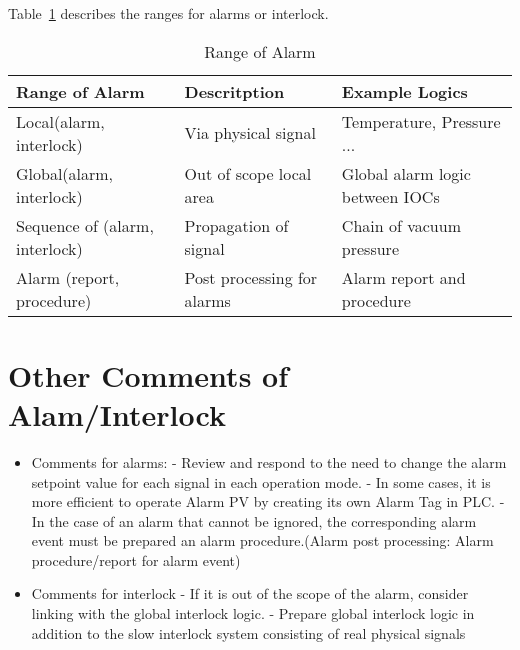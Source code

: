 \documentclass[11pt
  , letterpaper
  , article
  , oneside
  , showtrims
]{memoir}
\begin{document}
Table~\ref{table:scope_alarm} describes the ranges for alarms or interlock. 

\begin{table}[!h]
	\centering
	\begin{tabularx}{\textwidth}{l|l|l}
		\toprule
		Range of Alarm    				& Descritption       & Example Logics \\
		\midrule
		Local(alarm, interlock)         & Via physical signal  & Temperature, Pressure ... \\
		Global(alarm, interlock)        & Out of scope local area & Global alarm logic between IOCs\\ 
		Sequence of (alarm, interlock)  & Propagation of signal   & Chain of vacuum pressure \\
		Alarm (report, procedure) 	    & Post processing for alarms & Alarm report and procedure \\
		\bottomrule
	\end{tabularx}
	\label{table:scope_alarm}
	\caption{Range of Alarm}
\end{table}

\section{Other Comments of Alam/Interlock}
\begin{itemize}
	\item Comments for alarms:
	\newline
	- Review and respond to the need to change the alarm setpoint value for each signal in each operation mode.
	\newline
	- In some cases, it is more efficient to operate Alarm PV by creating its own Alarm Tag in PLC.
	\newline
	- In the case of an alarm that cannot be ignored, the corresponding alarm event must be prepared an alarm procedure.(Alarm post processing: Alarm procedure/report for alarm event)
		
	\item Comments for interlock
	\newline
	- If it is out of the scope of the alarm, consider linking with the global interlock logic.
	\newline
	- Prepare global interlock logic in addition to the slow interlock system consisting of real physical signals
\end{itemize}
\end{document}
